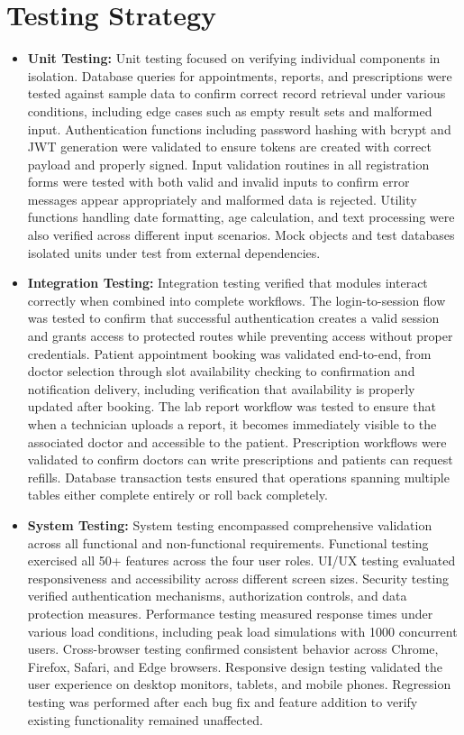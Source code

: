 \section{Testing Strategy}
\begin{itemize}
    \item \textbf{Unit Testing:} Unit testing focused on verifying individual components in isolation. Database queries for appointments, reports, and prescriptions were tested against sample data to confirm correct record retrieval under various conditions, including edge cases such as empty result sets and malformed input. Authentication functions including password hashing with bcrypt and JWT generation were validated to ensure tokens are created with correct payload and properly signed. Input validation routines in all registration forms were tested with both valid and invalid inputs to confirm error messages appear appropriately and malformed data is rejected. Utility functions handling date formatting, age calculation, and text processing were also verified across different input scenarios. Mock objects and test databases isolated units under test from external dependencies.

    \item \textbf{Integration Testing:} Integration testing verified that modules interact correctly when combined into complete workflows. The login-to-session flow was tested to confirm that successful authentication creates a valid session and grants access to protected routes while preventing access without proper credentials. Patient appointment booking was validated end-to-end, from doctor selection through slot availability checking to confirmation and notification delivery, including verification that availability is properly updated after booking. The lab report workflow was tested to ensure that when a technician uploads a report, it becomes immediately visible to the associated doctor and accessible to the patient. Prescription workflows were validated to confirm doctors can write prescriptions and patients can request refills. Database transaction tests ensured that operations spanning multiple tables either complete entirely or roll back completely.

    \item \textbf{System Testing:} System testing encompassed comprehensive validation across all functional and non-functional requirements. Functional testing exercised all 50+ features across the four user roles. UI/UX testing evaluated responsiveness and accessibility across different screen sizes. Security testing verified authentication mechanisms, authorization controls, and data protection measures. Performance testing measured response times under various load conditions, including peak load simulations with 1000 concurrent users. Cross-browser testing confirmed consistent behavior across Chrome, Firefox, Safari, and Edge browsers. Responsive design testing validated the user experience on desktop monitors, tablets, and mobile phones. Regression testing was performed after each bug fix and feature addition to verify existing functionality remained unaffected.
\end{itemize}

